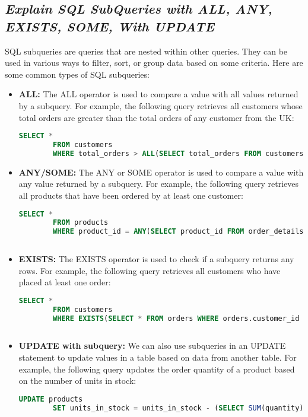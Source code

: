 \documentclass{article}
\begin{document}
\subsection{\textit{Explain SQL SubQueries with ALL, ANY, EXISTS, SOME, With UPDATE}}
SQL subqueries are queries that are nested within other queries. They can be used in various ways to filter, sort, or group data based on some criteria. Here are some common types of SQL subqueries:
\begin{itemize}
    \item \textbf{ALL:} The ALL operator is used to compare a value with all values returned by a subquery. For example, the following query retrieves all customers whose total orders are greater than the total orders of any customer from the UK:
    \begin{lstlisting}[language=SQL]
        SELECT *
        FROM customers
        WHERE total_orders > ALL(SELECT total_orders FROM customers WHERE country = 'UK');
    \end{lstlisting}      
    \item \textbf{ANY/SOME:} The ANY or SOME operator is used to compare a value with any value returned by a subquery. For example, the following query retrieves all products that have been ordered by at least one customer:
    \begin{lstlisting}[language=SQL]
        SELECT *
        FROM products
        WHERE product_id = ANY(SELECT product_id FROM order_details);
        
    \end{lstlisting}
    \item \textbf{EXISTS:} The EXISTS operator is used to check if a subquery returns any rows. For example, the following query retrieves all customers who have placed at least one order:
    \begin{lstlisting}[language=SQL]
        SELECT *
        FROM customers
        WHERE EXISTS(SELECT * FROM orders WHERE orders.customer_id = customers.customer_id);
        
    \end{lstlisting}
    \item \textbf{UPDATE with subquery:} We can also use subqueries in an UPDATE statement to update values in a table based on data from another table. For example, the following query updates the order quantity of a product based on the number of units in stock:
    \begin{lstlisting}[language=SQL]
        UPDATE products
        SET units_in_stock = units_in_stock - (SELECT SUM(quantity) FROM order_details WHERE order_details.product_id = products.product_id)
        
    \end{lstlisting}

\end{itemize}
\end{document}
